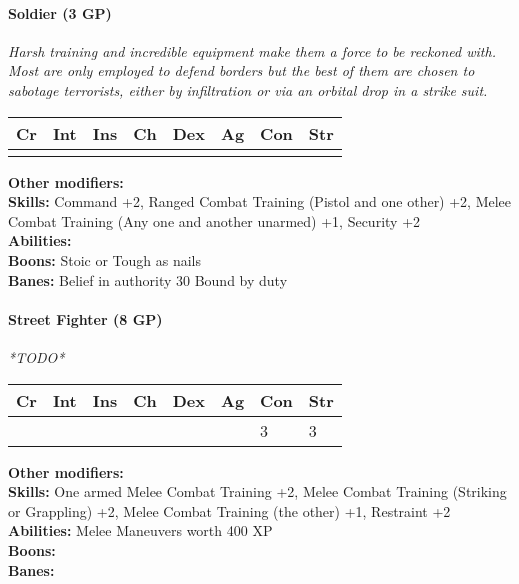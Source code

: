 \paragraph*{Soldier (3 GP)}
\textit{Harsh training and incredible equipment make them a force to be reckoned with. Most are only employed to defend borders but the best of them are chosen to sabotage terrorists, either by infiltration or via an orbital drop in a strike suit.}\par
\begin{tabular}{|l|l|l|l|l|l|l|l|}
	\hline
	Cr & Int & Ins & Ch & Dex & Ag & Con & Str \\ \hline
	&  &  &  &  &  &  &  \\ \hline
\end{tabular}\par
\noindent\textbf{Other modifiers:} \\
\textbf{Skills:} Command +2,
Ranged Combat Training (Pistol and one other) +2,
Melee Combat Training (Any one and another unarmed) +1,
Security +2\\
\textbf{Abilities:} \\
\textbf{Boons:} Stoic or Tough as nails\\
\textbf{Banes:} Belief in authority 30
Bound by duty\\

\hrulefill
\paragraph*{Street Fighter (8 GP)}
\textit{*TODO*}\par
\begin{tabular}{|l|l|l|l|l|l|l|l|}
    \hline
    Cr & Int & Ins & Ch & Dex & Ag & Con & Str \\ \hline
    &  &  &  &  &  & 3 & 3 \\ \hline
\end{tabular}\par
\noindent\textbf{Other modifiers:} \\
\textbf{Skills:} One armed Melee Combat Training +2,
Melee Combat Training (Striking or Grappling) +2,
Melee Combat Training (the other) +1,
Restraint +2\\
\textbf{Abilities:} Melee Maneuvers worth 400 XP\\
\textbf{Boons:} \\
\textbf{Banes:} \\

\hrulefill
